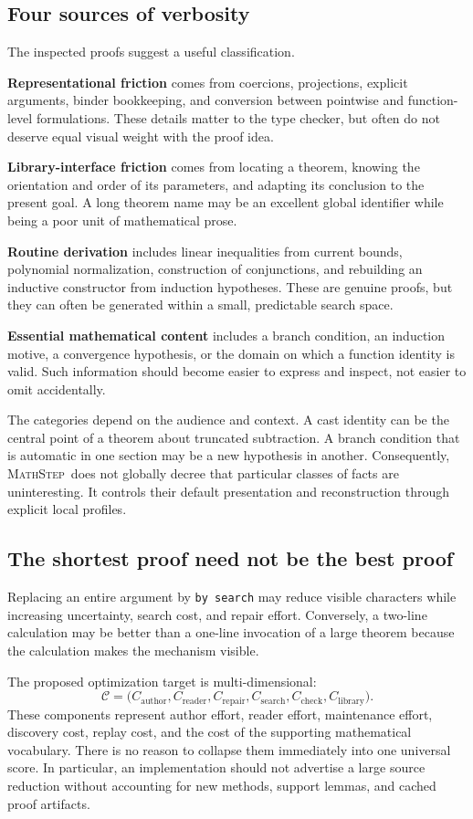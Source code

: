 \documentclass[11pt,a4paper]{article}
\theoremstyle{remark}
\newcommand{\ms}{\textsc{MathStep}}
\newcommand{\ty}[1]{\texttt{#1}}
\begin{document}
\subsection{Four sources of verbosity}
The inspected proofs suggest a useful classification.

\textbf{Representational friction} comes from coercions, projections, explicit arguments, binder bookkeeping, and conversion between pointwise and function-level formulations. These details matter to the type checker, but often do not deserve equal visual weight with the proof idea.

\textbf{Library-interface friction} comes from locating a theorem, knowing the orientation and order of its parameters, and adapting its conclusion to the present goal. A long theorem name may be an excellent global identifier while being a poor unit of mathematical prose.

\textbf{Routine derivation} includes linear inequalities from current bounds, polynomial normalization, construction of conjunctions, and rebuilding an inductive constructor from induction hypotheses. These are genuine proofs, but they can often be generated within a small, predictable search space.

\textbf{Essential mathematical content} includes a branch condition, an induction motive, a convergence hypothesis, or the domain on which a function identity is valid. Such information should become easier to express and inspect, not easier to omit accidentally.

The categories depend on the audience and context. A cast identity can be the central point of a theorem about truncated subtraction. A branch condition that is automatic in one section may be a new hypothesis in another. Consequently, \ms\ does not globally decree that particular classes of facts are uninteresting. It controls their default presentation and reconstruction through explicit local profiles.

\subsection{The shortest proof need not be the best proof}
Replacing an entire argument by \ty{by search} may reduce visible characters while increasing uncertainty, search cost, and repair effort. Conversely, a two-line calculation may be better than a one-line invocation of a large theorem because the calculation makes the mechanism visible.

The proposed optimization target is multi-dimensional:
\[
\mathcal{C}=\bigl(C_{\mathrm{author}},C_{\mathrm{reader}},C_{\mathrm{repair}},
C_{\mathrm{search}},C_{\mathrm{check}},C_{\mathrm{library}}\bigr).
\]
These components represent author effort, reader effort, maintenance effort, discovery cost, replay cost, and the cost of the supporting mathematical vocabulary. There is no reason to collapse them immediately into one universal score. In particular, an implementation should not advertise a large source reduction without accounting for new methods, support lemmas, and cached proof artifacts.
\end{document}
